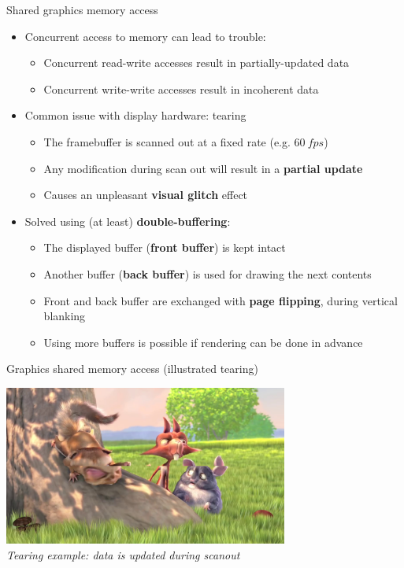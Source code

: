 \begin{frame}{Shared graphics memory access}
  \begin{itemize}
  \item Concurrent access to memory can lead to trouble:
    \begin{itemize}
    \item Concurrent read-write accesses result in partially-updated data
    \item Concurrent write-write accesses result in incoherent data
    \end{itemize}
  \item Common issue with display hardware: tearing
    \begin{itemize}
    \item The framebuffer is scanned out at a fixed rate (e.g. \(60~fps\))
    \item Any modification during scan out will result in a \textbf{partial update}
    \item Causes an unpleasant \textbf{visual glitch} effect
    \end{itemize}
  \item Solved using (at least) \textbf{double-buffering}:
    \begin{itemize}
    \item The displayed buffer (\textbf{front buffer}) is kept intact
    \item Another buffer (\textbf{back buffer}) is used for drawing the next contents
    \item Front and back buffer are exchanged with \textbf{page flipping}, during vertical blanking
    \item Using more buffers is possible if rendering can be done in advance
    \end{itemize}
  \end{itemize}
\end{frame}

\begin{frame}{Graphics shared memory access (illustrated tearing)}
  \begin{center}
  \includegraphics[width=0.7\textwidth]{slides/graphics-hardware/tearing-glitch.jpg}\\
  \textit{\small Tearing example: data is updated during scanout}
  \end{center}
\end{frame}

